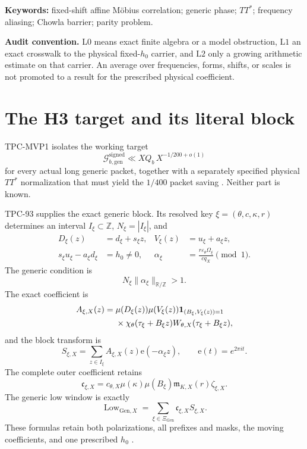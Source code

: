 \documentclass[11pt]{article}
\theoremstyle{definition}
\theoremstyle{remark}
\newcommand{\one}{\mathbf 1}
\newcommand{\Lzero}{\mathrm{L0}}
\newcommand{\Lone}{\mathrm{L1}}
\newcommand{\Ltwo}{\mathrm{L2}}
\newcommand{\e}{\mathrm e}
\begin{document}
\noindent\textbf{Keywords:} fixed-shift affine M\"obius
correlation; generic phase; \(TT^*\); frequency aliasing; Chowla
barrier; parity problem.

\medskip
\noindent\textbf{Audit convention.}
\(\Lzero\) means exact finite algebra or a model obstruction,
\(\Lone\) an exact crosswalk to the physical fixed-\(h_0\) carrier,
and \(\Ltwo\) only a growing arithmetic estimate on that carrier.
An average over frequencies, forms, shifts, or scales is not promoted
to a result for the prescribed physical coefficient.

\section{The H3 target and its literal block}

TPC-MVP1 isolates the working target
\begin{equation}
 \mathcal G_{b,\mathrm{gen}}^{\mathrm{signed}}
 \ll XQ_b\,X^{-1/200+o(1)}
\label{eq:h3-target}
\end{equation}
for every actual long generic packet, together with a separately
specified physical \(TT^*\) normalization that must yield the
\(1/400\) packet saving \citep{WangTPCMVP1}.  Neither part is known.

TPC-93 supplies the exact generic block.  Its resolved key
\(\xi=(\theta,c,\kappa,r)\) determines an interval
\(I_\xi\subset\mathbb Z\), \(N_\xi=|I_\xi|\), and
\begin{align}
 D_\xi(z)&=d_\xi+s_\xi z,&
 V_\xi(z)&=u_\xi+a_\xi z,
\label{eq:forms}\\
 s_\xi u_\xi-a_\xi d_\xi&=h_0\ne0,&
 \alpha_\xi&=
 \frac{r\varepsilon_\theta\Omega_\xi}{cq_X}
 \pmod1.
\label{eq:det-phase}
\end{align}
The generic condition is
\begin{equation}
 N_\xi\|\alpha_\xi\|_{\mathbb R/\mathbb Z}>1.
\label{eq:generic}
\end{equation}
The exact coefficient is
\begin{align}
 A_{\xi,X}(z)
 ={}&
 \mu(D_\xi(z))\mu(V_\xi(z))
 \one_{(B_\xi,V_\xi(z))=1}
\notag\\
 &\times
 \chi_\theta(\tau_\xi+B_\xi z)
 W_{\theta,X}(\tau_\xi+B_\xi z),
\label{eq:literal-coefficient}
\end{align}
and the block transform is
\begin{equation}
 S_{\xi,X}
 =
 \sum_{z\in I_\xi}
 A_{\xi,X}(z)\e(-\alpha_\xi z),
\qquad
 \e(t)=e^{2\pi it}.
\label{eq:block-transform}
\end{equation}
The complete outer coefficient retains
\[
 \mathfrak c_{\xi,X}
 =
 c_{\theta,X}\mu(\kappa)\mu(B_\xi)
 \mathfrak m_{K,X}(r)\zeta_{\xi,X}.
\]
The generic low window is exactly
\begin{equation}
 \operatorname{Low}_{\mathrm{Gen},X}
 =
 \sum_{\xi\in\Xi_{\mathrm{Gen}}}
 \mathfrak c_{\xi,X}S_{\xi,X}.
\label{eq:generic-low-window}
\end{equation}
These formulas retain both polarizations, all prefixes and masks,
the moving coefficients, and one prescribed \(h_0\)
\citep{WangTPC93}.
\end{document}
